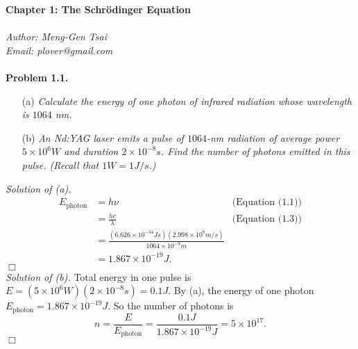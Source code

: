 \documentclass{article}
\begin{document}
\textbf{\Large Chapter 1: The Schr\"odinger Equation} \\\\



\emph{Author: Meng-Gen Tsai} \\
\emph{Email: plover@gmail.com} \\\\






\textbf{Problem 1.1.}
\begin{enumerate}
\item[(a)]
\emph{Calculate the energy of one photon of infrared radiation whose wavelength
is $1064$ nm.}
\item[(b)]
\emph{An Nd:YAG laser emits a pulse of $1064$-nm radiation of average power
$5 \times 10^6 W$ and duration $2 \times 10^{-8}s$.
Find the number of photons emitted in this pulse. (Recall that $1W = 1J/s$.)}
\end{enumerate}

\emph{Solution of (a).}
\begin{align*}
E_{\text{photon}}
&= h \nu
  &\text{(Equation (1.1))} \\
&= \frac{hc}{\lambda}
  &\text{(Equation (1.3))} \\
&= \frac{(6.626 \times 10^{-34}Js)(2.998 \times 10^8 m/s)}{1064 \times 10^{-9} m} \\
&= 1.867 \times 10^{-19} J.
\end{align*}
$\Box$ \\

\emph{Solution of (b).}
Total energy in one pulse is $E = (5 \times 10^6 W)(2 \times 10^{-8}s) = 0.1J$.
By (a), the energy of one photon $E_{\text{photon}} = 1.867 \times 10^{-19} J$.
So the number of photons is
$$n = \frac{E}{E_{\text{photon}}}
= \frac{0.1J}{1.867 \times 10^{-19} J}
= 5 \times 10^{17}.$$
$\Box$ \\\\



\end{document}
